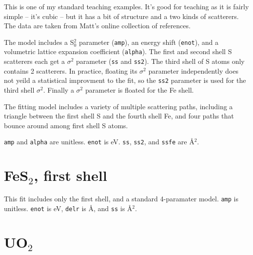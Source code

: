 \documentclass{article}
\let\stdsection\section
\renewcommand\section{\newpage\stdsection}
\begin{document}
This is one of my standard teaching examples.  It's good for teaching
as it is fairly simple -- it's cubic -- but it has a bit of structure
and a two kinds of scatterers.  The data are taken from Matt's online
collection of references.

The model includes a S$_0^2$ parameter (\texttt{amp}), an energy shift
(\texttt{enot}), and a volumetric lattice expansion coefficient
(\texttt{alpha}).  The first and second shell S scatterers each get a
$\sigma^2$ parameter (\texttt{ss} and \texttt{ss2}).  The third shell
of S atoms only contains 2 scatterers.  In practice, floating its
$\sigma^2$ parameter independently does not yeild a statistical
improvment to the fit, so the \texttt{ss2} parameter is used for the
third shell $\sigma^2$.  Finally a $\sigma^2$ parameter is floated for
the Fe shell.

The fitting model includes a variety of multiple scattering paths,
including a triangle between the first shell S and the fourth shell
Fe, and four paths that bounce around among first shell S atoms.

\texttt{amp} and \texttt{alpha} are unitless.  \texttt{enot} is eV.
\texttt{ss}, \texttt{ss2}, and \texttt{ssfe} are \AA$^2$.

\def\feffmaterial{FeS2}
\def\feffrone{3}
\def\feffrtwo{3.6}
\def\feffrthree{4}
\def\feffrfour{5.3}
\def\feffrfive{5.5}
\def\fefffirst{}

\small

\fitplots




\section{FeS$_2$, first shell}

\normalsize
This fit includes only the first shell, and a standard 4-paramater
model.  \texttt{amp} is unitless.  \texttt{enot} is eV, \texttt{delr}
is \AA, and \texttt{ss} is \AA$^2$.


\def\fefffirst{_1st}

\small

\fitplots






\section{UO$_2$}
\normalsize
\end{document}
